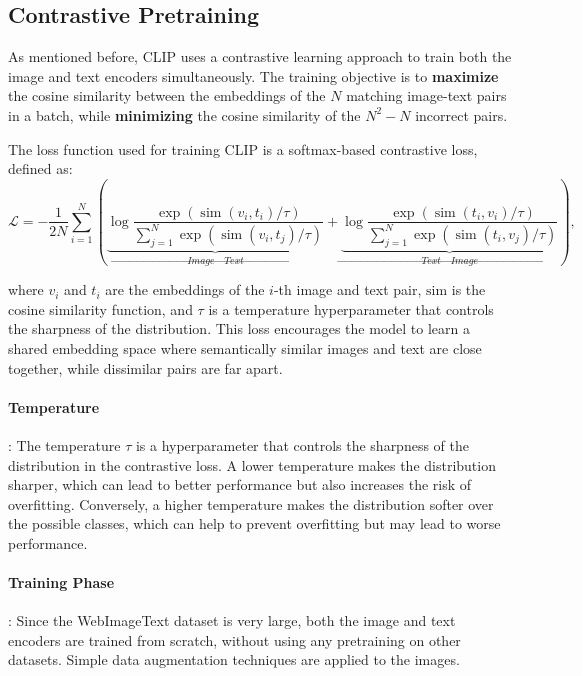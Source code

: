 \subsection{Contrastive Pretraining}
As mentioned before, CLIP uses a contrastive learning approach to train both the image and text encoders simultaneously.
The training objective is to \textbf{maximize} the cosine similarity between the embeddings of the $N$ matching 
image-text pairs in a batch, while \textbf{minimizing} the cosine similarity of the $N^2 - N$ incorrect pairs.

The loss function used for training CLIP is a softmax-based contrastive loss, defined as:
\begin{equation}
    \mathcal{L} = -\frac{1}{2N} \sum_{i=1}^{N} \left(
    \underbrace{\log \frac{\exp(\operatorname{sim}(v_i, t_i) / \tau)}{\sum_{j=1}^{N} \exp(\operatorname{sim}(v_i, t_j) / \tau)}}_{\textit{Image} \to \textit{Text}}
    +
    \underbrace{\log \frac{\exp(\operatorname{sim}(t_i, v_i) / \tau)}{\sum_{j=1}^{N} \exp(\operatorname{sim}(t_i, v_j) / \tau)}}_{\textit{Text} \to \textit{Image}}\right),
\end{equation}

where $v_i$ and $t_i$ are the embeddings of the $i$-th image and text pair, $\text{sim}$ is the cosine similarity function, and $\tau$ is a temperature hyperparameter that controls the sharpness of the distribution.
This loss encourages the model to learn a shared embedding space where semantically similar images and text are
close together, while dissimilar pairs are far apart.

\paragraph{Temperature}: The temperature $\tau$ is a hyperparameter that controls the sharpness of the distribution in the contrastive loss.
A lower temperature makes the distribution sharper, which can lead to better performance but also increases the risk of overfitting. 
Conversely, a higher temperature makes the distribution softer over the possible classes, which can help to prevent overfitting but may lead to worse performance.

\paragraph{Training Phase}: Since the WebImageText dataset is very large, both the image and text encoders are trained from scratch, without using any pretraining on other datasets.
Simple data augmentation techniques are applied to the images.

